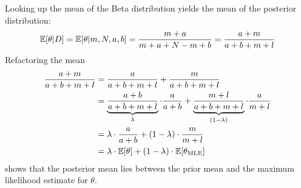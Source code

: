 Looking up the mean of the Beta distribution yields the mean of the posterior distribution:
\[ \mathbb{E}[\theta|D] = \mathbb{E}[\theta|m,N,a,b] = \frac{m+a}{m+a+N-m+b} = \frac{a+m}{a+b+m+l} \]
Refactoring the mean
\begin{align*}
  \frac{a+m}{a+b+m+l} &= \frac{a}{a+b+m+l} + \frac{m}{a+b+m+l} \\
  &= \underbrace{\frac{a+b}{a+b+m+l}}_{\lambda} \cdot \frac{a}{a+b} + \underbrace{\frac{m+l}{a+b+m+l}}_{(1-\lambda)} \cdot \frac{a}{m+l} \\
  &= \lambda \cdot \frac{a}{a+b} + (1-\lambda)\cdot\frac{m}{m+l} \\
  &= \lambda \cdot \mathbb{E}[\theta] + (1-\lambda) \cdot \mathbb{E}[\theta_\text{MLE}]
\end{align*}
shows that the posterior mean lies between the prior mean and the maximum likelihood estimate for $\theta$.
%
%
%
%

%



